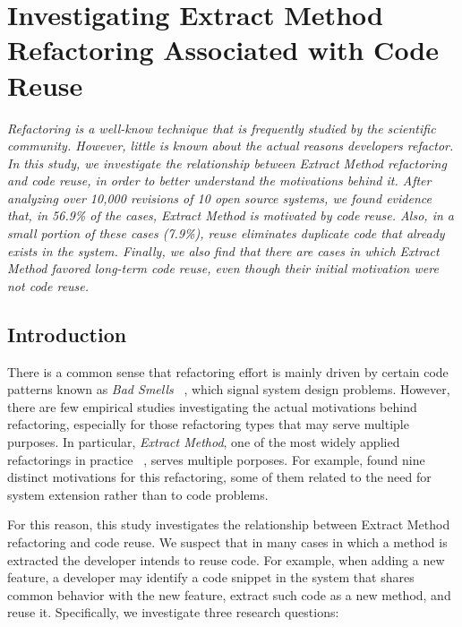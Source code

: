 \chapter{Investigating Extract Method Refactoring Associated with Code Reuse}
\label{ChCibse}


\noindent\textit{Refactoring is a well-know technique that is frequently studied by the scientific community.
However, little is known about the actual reasons developers refactor.
In this study, we investigate the relationship between Extract Method refactoring and code reuse, in order to better understand the motivations behind it.
After analyzing over 10,000 revisions of 10 open source systems, we found evidence that, in 56.9\% of the cases, Extract Method is motivated by code reuse.
Also, in a small portion of these cases (7.9\%), reuse eliminates duplicate code that already exists in the system.
Finally, we also find that there are cases in which Extract Method favored long-term code reuse, even though their initial motivation were not code reuse.
}

\section{Introduction}


There is a common sense that refactoring effort is mainly driven by certain code patterns known as \emph{Bad Smells} ~\citep{Fowler:1999}, which signal system design problems. However, there are few empirical studies investigating the actual motivations behind refactoring, especially for those refactoring types that may serve multiple purposes.
In particular, \emph{Extract Method}, one of the most widely applied refactorings in practice ~\citep{MurphyHill2012, negara2013}, serves multiple porposes.
For example, \cite{tsantalis_empiricalstudy} found nine distinct motivations for this refactoring, some of them related to the need for system extension rather than to code problems.

For this reason, this study investigates the relationship between Extract Method refactoring and code reuse.
We suspect that in many cases in which a method is extracted the developer intends to reuse code. For example, when adding a new feature, a developer may identify a code snippet in the system that shares common behavior with the new feature, extract such code as a new method, and reuse it.
Specifically, we investigate three research questions:

